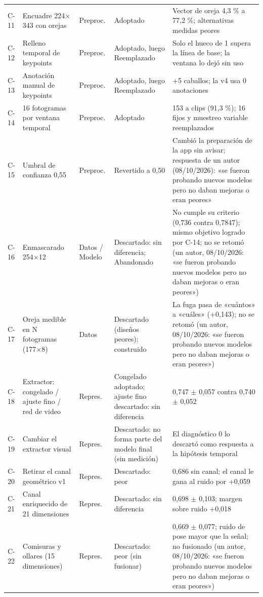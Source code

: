 \begin{longtable}{@{}p{}p{}p{}p{}p{}@{}}
C-11 & Encuadre 224\ensuremath{\times}343 con orejas & Preproc. & Adoptado & Vector de oreja 4,3 \% a 77,2 \%; alternativas medidas peores \\
C-12 & Relleno temporal de keypoints & Preproc. & Adoptado, luego Reemplazado & Solo el hueco de 1 supera la línea de base; la ventana lo dejó sin uso \\
C-13 & Anotación manual de keypoints & Preproc. & Adoptado, luego Reemplazado & +5 caballos; la v4 usa 0 anotaciones \\
C-14 & 16 fotogramas por ventana temporal & Preproc. & Adoptado & 153 a \ClipsTotal{} clips (91,3 \%); 16 fijos y muestreo variable reemplazados \\
C-15 & Umbral de confianza 0,55 & Preproc. & Revertido a 0,50 & Cambió la preparación de la app sin avisar; respuesta de un autor (08/10/2026): «se fueron probando nuevos modelos pero no daban mejoras o eran peores» \\
C-16 & Enmascarado 254\ensuremath{\times}12 & Datos / Modelo & Descartado: sin diferencia; Abandonado & No cumple su criterio (0,736 contra 0,7847); mismo objetivo logrado por C-14; no se retomó (un autor, 08/10/2026: «se fueron probando nuevos modelos pero no daban mejoras o eran peores») \\
C-17 & Oreja medible en N fotogramas (177\ensuremath{\times}8) & Datos & Descartado (diseños peores); construido & La fuga pasa de «cuántos» a «cuáles» (+0,143); no se retomó (un autor, 08/10/2026: «se fueron probando nuevos modelos pero no daban mejoras o eran peores») \\
C-18 & Extractor: congelado / ajuste fino / red de video & Repres. & Congelado adoptado; ajuste fino descartado: sin diferencia & 0,747 \ensuremath{\pm} 0,057 contra 0,740 \ensuremath{\pm} 0,052 \\
C-19 & Cambiar el extractor visual & Repres. & Descartado: no forma parte del modelo final (sin medición) & El diagnóstico 0 lo descartó como respuesta a la hipótesis temporal \\
C-20 & Retirar el canal geométrico v1 & Repres. & Descartado: peor & 0,686 sin canal; el canal le gana al ruido por +0,059 \\
C-21 & Canal enriquecido de 21 dimensiones & Repres. & Descartado: sin diferencia & 0,698 \ensuremath{\pm} 0,103; margen sobre ruido +0,018 \\
C-22 & Comisuras y ollares (15 dimensiones) & Repres. & Descartado: peor (sin fusionar) & 0,669 \ensuremath{\pm} 0,077; ruido de pose mayor que la señal; no fusionado (un autor, 08/10/2026: «se fueron probando nuevos modelos pero no daban mejoras o eran peores») \\

\end{longtable}
